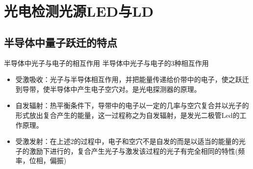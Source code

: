 \documentclass[trans]{beamer} %
\begin{document}

\section{光电检测光源LED与LD} 
\subsection{半导体中量子跃迁的特点}

\begin{frame}{半导体中光子与电子的相互作用}
半导体中光子与电子的3种相互作用
    \begin{itemize}
        \item \alert{受激吸收}：光子与半导体相互作用，并把能量传递给价带中的电子，使之跃迁到导带，使半导体中产生电子空穴对。是光电探测器的原理。
        \item  \alert{自发辐射}：热平衡条件下，导带中的电子以一定的几率与空穴复合并以光子的形式放出复合产生的能量，这一过程称之为自发辐射，是发光二极管Led的工作原理。
        \item \alert{ 受激发射}：在上述2的过程中，电子和空穴不是自发的而是以适当的能量的光子的激励下进行的，复合产生光子与激发该过程的光子有完全相同的特性(频率，位相，偏振)

    \end{itemize}
 \end{frame}
 
\end{document}
